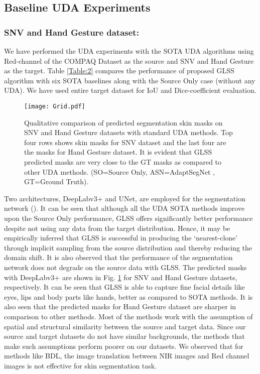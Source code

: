 \documentclass[runningheads]{llncs}
\begin{document}
\subsection{Baseline UDA Experiments}
\subsubsection{SNV and Hand Gesture dataset:}
We have performed the UDA experiments with the SOTA UDA algorithms using Red-channel of the COMPAQ Dataset  \cite{jones2002statistical} as the source and SNV and Hand Gesture as the target.
Table \ref{Table:2} compares the performance of proposed GLSS algorithm with six SOTA baselines along with the Source Only case (without any UDA). We have used entire target dataset for IoU and Dice-coefficient evaluation. 
\begin{figure}[h]
\centering
    \texttt{[image: Grid.pdf]}
    \caption{Qualitative comparison of predicted segmentation skin masks on SNV and Hand Gesture datasets with standard UDA methods. Top four rows shows skin masks for SNV dataset and the last four are the masks for Hand Gesture dataset. It is evident that GLSS predicted masks are very close to the GT masks as compared to other UDA methods. (SO=Source Only, ASN=AdaptSegNet \cite{tsai2018learning}, GT=Ground Truth).
    }
    \label{fig:gridmasks}
\end{figure}
 Two architectures, DeepLabv3+ and UNet, are employed for the segmentation network (). It can be seen that although all the UDA SOTA methods improve upon the Source Only performance, GLSS offers significantly better performance despite not using any data from the target distribution. Hence, it may be empirically inferred that GLSS is successful in producing the `nearest-clone' through implicit sampling from the source distribution and thereby reducing the domain shift. It is also observed that the performance of the segmentation network  does not degrade on the source data with GLSS. 
The predicted masks with DeepLabv3+ are shown in Fig. \ref{fig:gridmasks} for SNV and Hand Gesture datasets, respectively. It can be seen that GLSS is able to capture fine facial details like eyes, lips and body parts like hands, better as compared to SOTA methods. It is also seen that the predicted masks for Hand Gesture dataset are sharper in comparison to other methods. 
Most of the methods work with the assumption of spatial and structural similarity between the source and target data. Since our source and target datasets do not have similar backgrounds, the methods that make such assumptions perform poorer on our datasets. We observed that for methods like BDL, the image translation between NIR images and Red channel images is not effective for skin segmentation task.
\end{document}
